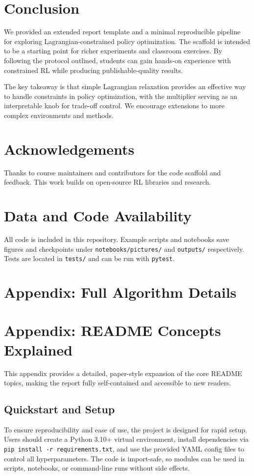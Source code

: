 \section{Conclusion}
\label{sec:conclusion}

We provided an extended report template and a minimal reproducible pipeline for exploring Lagrangian-constrained policy optimization. The scaffold is intended to be a starting point for richer experiments and classroom exercises. By following the protocol outlined, students can gain hands-on experience with constrained RL while producing publishable-quality results.

The key takeaway is that simple Lagrangian relaxation provides an effective way to handle constraints in policy optimization, with the multiplier serving as an interpretable knob for trade-off control. We encourage extensions to more complex environments and methods.

\section*{Acknowledgements}

Thanks to course maintainers and contributors for the code scaffold and feedback. This work builds on open-source RL libraries and research.

\section*{Data and Code Availability}

All code is included in this repository. Example scripts and notebooks save figures and checkpoints under \texttt{notebooks/pictures/} and \texttt{outputs/} respectively. Tests are located in \texttt{tests/} and can be run with \texttt{pytest}.

\appendix
\section{Appendix: Full Algorithm Details}
\label{app:algorithm}

\section{Appendix: README Concepts Explained}
This appendix provides a detailed, paper-style expansion of the core README topics, making the report fully self-contained and accessible to new readers.

\subsection{Quickstart and Setup}
To ensure reproducibility and ease of use, the project is designed for rapid setup. Users should create a Python 3.10+ virtual environment, install dependencies via \texttt{pip install -r requirements.txt}, and use the provided YAML config files to control all hyperparameters. The code is import-safe, so modules can be used in scripts, notebooks, or command-line runs without side effects.

